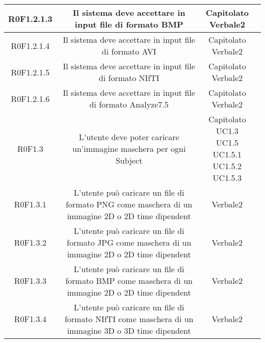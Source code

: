 \begin{center}
\begin{longtable}{|c|c|c|c|}
\hline
R0F1.2.1.3   & \parbox[t]{\larghezza}{Il sistema deve accettare in input file di formato BMP\glossario{}}  & \parbox[t]{\dimFonti}{ Capitolato \\ Verbale2 \\} \\
\hline
R0F1.2.1.4   & \parbox[t]{\larghezza}{Il sistema deve accettare in input file di formato AVI\glossario{}}  & \parbox[t]{\dimFonti}{ Capitolato \\ Verbale2 \\} \\
\hline
R0F1.2.1.5   & \parbox[t]{\larghezza}{Il sistema deve accettare in input file di formato NIfTI\glossario{}}  & \parbox[t]{\dimFonti}{ Capitolato \\ Verbale2 \\} \\
\hline
R0F1.2.1.6   & \parbox[t]{\larghezza}{Il sistema deve accettare in input file di formato Analyze7.5}  & \parbox[t]{\dimFonti}{ Capitolato \\ Verbale2 \\} \\
\hline
R0F1.3   & \parbox[t]{\larghezza}{L'utente deve poter caricare un'immagine maschera\glossario{} per ogni Subject\glossario{}}  & \parbox[t]{\dimFonti}{ Capitolato \\ UC1.3 \\ UC1.5 \\ UC1.5.1 \\ UC1.5.2 \\ UC1.5.3 \\} \\
\hline
R0F1.3.1   & \parbox[t]{\larghezza}{L'utente può caricare un file di formato PNG\glossario{} come maschera\glossario{} di un immagine 2D o 2D time dipendent}  & \parbox[t]{\dimFonti}{ Verbale2 \\} \\
\hline
R0F1.3.2   & \parbox[t]{\larghezza}{L'utente può caricare un file di formato JPG\glossario{} come maschera\glossario{} di un immagine 2D o 2D time dipendent}  & \parbox[t]{\dimFonti}{ Verbale2 \\} \\
\hline
R0F1.3.3   & \parbox[t]{\larghezza}{L'utente può caricare un file di formato BMP\glossario{} come maschera\glossario{} di un immagine 2D o 2D time dipendent}  & \parbox[t]{\dimFonti}{ Verbale2 \\} \\
\hline
R0F1.3.4   & \parbox[t]{\larghezza}{L'utente può caricare un file di formato NIfTI\glossario{} come maschera\glossario{} di un immagine 3D o 3D time dipendent}  & \parbox[t]{\dimFonti}{ Verbale2 \\} \\

\end{longtable}
\end{center}
